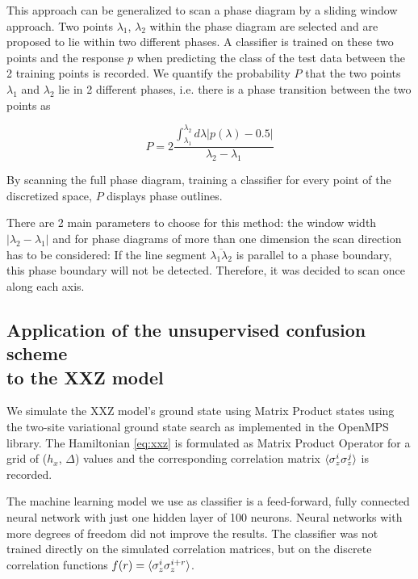 \documentclass[prl, reprint, twocolumn]{revtex4-1}
\begin{document}
	This approach can be generalized to scan a phase diagram by a sliding window approach\cite{Broecker2017}. Two points $\lambda_1$, $\lambda_2$ within the phase diagram are selected and are proposed to lie within two different phases. A classifier is trained on these two points and the response $p$ when predicting the class of the test data between the 2 training points is recorded. We quantify the probability $P$ that the two points $\lambda_1$ and $\lambda_2$ lie in 2 different phases, i.e. there is a phase transition between the two points as
	
	\begin{equation}
		 P = 2\frac{\int_{\lambda_1}^{\lambda_2} d\lambda |p(\lambda) - 0.5|}{\lambda_2-\lambda_1}
		 \label{eq:P}
	\end{equation}
	
	By scanning the full phase diagram, training a classifier for every point of the discretized space, $P$ displays phase outlines.
	
	There are 2 main parameters to choose for this method: the window width $|\lambda_2-\lambda_1|$ and for phase diagrams of more than one dimension the scan direction has to be considered: If the line segment $\overline{\lambda_1\lambda_2}$ is parallel to a phase boundary, this phase boundary will not be detected.
	Therefore, it was decided to scan once along each axis.
	
	
	
	\subsection{Application of the unsupervised confusion scheme \\ to the XXZ model}
	We simulate the XXZ model's ground state using Matrix Product states\cite{Schollwoeck2011} using the two-site variational ground state search as implemented in the OpenMPS library\cite{Jaschke2018, Wall2012}. The Hamiltonian \ref{eq:xxz} is formulated as Matrix Product Operator for a grid of ($h_x$, $\Delta$) values and the corresponding correlation matrix $\braket{\sigma^i_z\sigma^j_z}$ is recorded.
	
	The machine learning model we use as classifier is a feed-forward, fully connected neural network with just one hidden layer of 100 neurons. Neural networks with more degrees of freedom did not improve the results. The classifier was not trained directly on the simulated correlation matrices, but on the discrete correlation functions $f(r) = \braket{\sigma^i_z\sigma^{i+r}_z}$.
	
\end{document}
